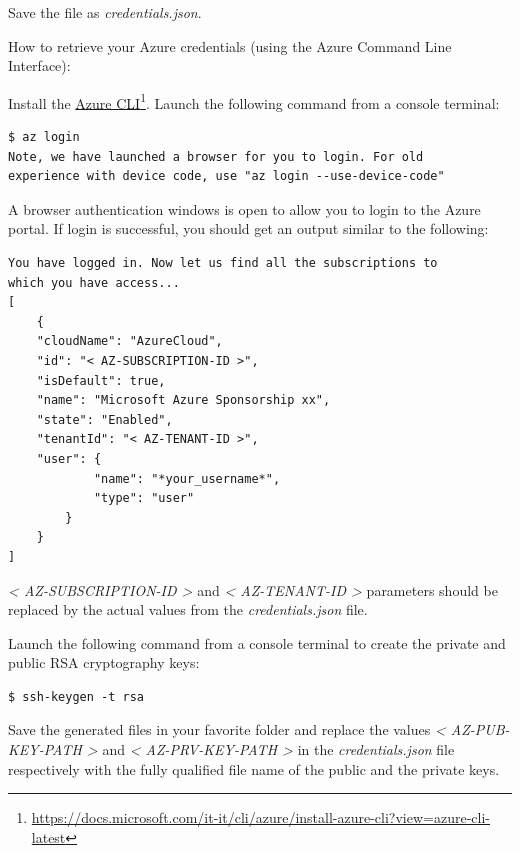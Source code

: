 Save the file as \emph{credentials.json}.

How to retrieve your Azure credentials (using the Azure Command Line
Interface):

Install the
\href{https://docs.microsoft.com/it-it/cli/azure/install-azure-cli?view=azure-cli-latest}{Azure CLI}\footnote{\url{https://docs.microsoft.com/it-it/cli/azure/install-azure-cli?view=azure-cli-latest}}. Launch the following command from a console terminal:

\begin{verbatim}
$ az login
Note, we have launched a browser for you to login. For old 
experience with device code, use "az login --use-device-code"
\end{verbatim}

A browser authentication windows is open to allow you to login to the
Azure portal. If login is successful, you should get an output similar
to the following:

\begin{verbatim}
You have logged in. Now let us find all the subscriptions to 
which you have access...
[
    {
    "cloudName": "AzureCloud",
    "id": "< AZ-SUBSCRIPTION-ID >",
    "isDefault": true,
    "name": "Microsoft Azure Sponsorship xx",
    "state": "Enabled",
    "tenantId": "< AZ-TENANT-ID >",
    "user": {
            "name": "*your_username*",
            "type": "user"
        }
    }
]
\end{verbatim}

\emph{\textless{} AZ-SUBSCRIPTION-ID 
\textgreater{}} and \emph{\textless{} AZ-TENANT-ID \textgreater{}}
parameters should be replaced by the actual values from the \emph{credentials.json} file.

Launch the following command from a console terminal to create the
private and public RSA cryptography keys:

\begin{verbatim}
$ ssh-keygen -t rsa
\end{verbatim}

Save the generated files in your favorite folder and replace the values
\emph{\textless{} AZ-PUB-KEY-PATH \textgreater{}} and \emph{\textless{}
AZ-PRV-KEY-PATH \textgreater{}} in the \emph{credentials.json} file
respectively with the fully qualified file name of the public and the
private keys.

